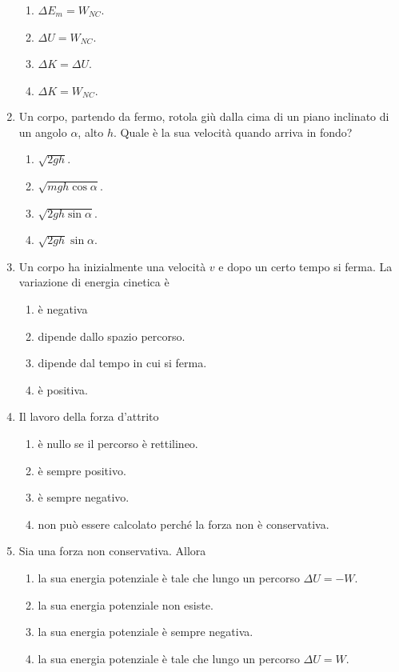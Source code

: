 \documentclass{article}
\begin{document}
\begin{enumerate}
\begin{enumerate}[label=\Alph*.]
    \item $\Delta E_m=W_{NC}$.
    \item $\Delta U=W_{NC}$.
    \item $\Delta K = \Delta U$.
    \item $\Delta K=W_{NC}.$
  \end{enumerate}
  \item Un corpo, partendo da fermo, rotola giù dalla cima di un piano inclinato di un angolo $\alpha$, alto $h$. Quale è la sua velocità quando arriva in fondo?
  \begin{enumerate}[label=\Alph*.]
    \item $\sqrt{2gh}$.
    \item $\sqrt{mgh\cos\alpha}$.
    \item $\sqrt{2gh\sin\alpha}$.
    \item $\sqrt{2gh}\sin\alpha$.
  \end{enumerate}
  \item Un corpo ha inizialmente una velocità $v$ e dopo un certo tempo si ferma. La variazione di energia cinetica è
  \begin{enumerate}[label=\Alph*.]
    \item è negativa
    \item dipende dallo spazio percorso.
    \item dipende dal tempo in cui si ferma.
    \item è positiva.
  \end{enumerate}
  \item Il lavoro della forza d'attrito
  \begin{enumerate}[label=\Alph*.]
    \item è nullo se il percorso è rettilineo.
    \item è sempre positivo.
    \item è sempre negativo.
    \item non può essere calcolato perché la forza non è conservativa.
  \end{enumerate}
  \item Sia  una forza non conservativa. Allora
  \begin{enumerate}[label=\Alph*.]
    \item la sua energia potenziale è tale che lungo un percorso $\Delta U=-W$.
    \item la sua energia potenziale non esiste.
    \item la sua energia potenziale è sempre negativa.
    \item la sua energia potenziale è tale che lungo un percorso $\Delta U=W$.

\end{enumerate}
\end{enumerate}
\end{document}
